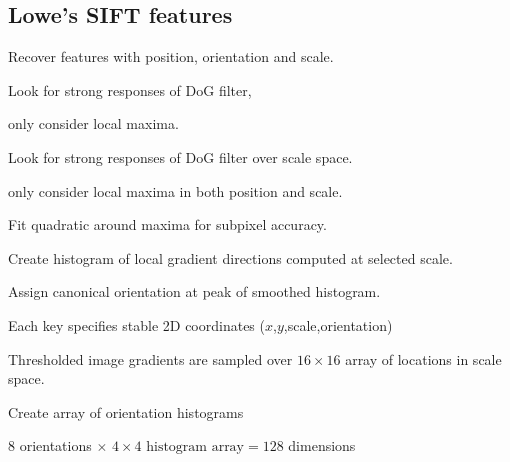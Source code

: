 \begin{compactdesc}
		\subsection{Lowe's SIFT features}
		Recover features with position, orientation and scale. 
	\item[\lp{Position}] 
		\begin{inparaenum}[\itshape(1)]
		\item Look for strong responses of DoG filter,
		\item only consider local maxima.
		\end{inparaenum}
	\item[\lp{Scale}] 
		\begin{inparaenum}[\itshape(1)]
			\item Look for strong responses of DoG filter over scale space. 
			\item only consider local maxima in both position and scale. 
			\item Fit quadratic around maxima for subpixel accuracy.
		\end{inparaenum}
	\item[\lp{Orientation}] 
		\begin{inparaenum}[\itshape(1)]
			\item Create histogram of local gradient directions computed at selected scale.
			\item Assign canonical orientation at peak of smoothed histogram.
			\item Each key specifies stable 2D coordinates ($x$,$y$,scale,orientation)
		\end{inparaenum}
	\item[\lp{SIFT descriptior}]
		\begin{inparaenum}[\itshape(1)]
			\item Thresholded image gradients are sampled over $16\times16$ array of locations in scale space.
			\item Create array of orientation histograms
			\item 8 orientations $\times$ $4\times4\text{ histogram array}=128$ dimensions
		\end{inparaenum}
\end{compactdesc}
